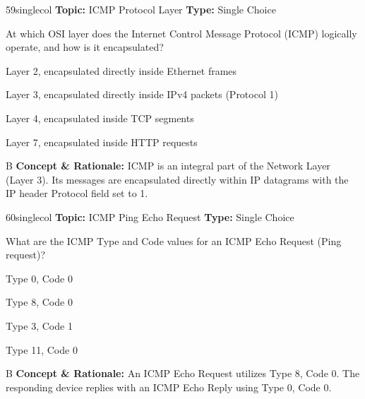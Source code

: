 \begin{qcard}{59}{singlecol}
\textcolor{darkslate!75}{\small\textbf{Topic:} ICMP Protocol Layer \hfill \textbf{Type:} Single Choice}\vspace{0.4em}\par
At which OSI layer does the Internet Control Message Protocol (ICMP) logically operate, and how is it encapsulated?
\begin{qoptions}
\item Layer 2, encapsulated directly inside Ethernet frames
\item Layer 3, encapsulated directly inside IPv4 packets (Protocol 1)
\item Layer 4, encapsulated inside TCP segments
\item Layer 7, encapsulated inside HTTP requests
\end{qoptions}
\end{qcard}
\nopagebreak
\begin{explainbox}{B}
\textbf{Concept \& Rationale:} ICMP is an integral part of the Network Layer (Layer 3). Its messages are encapsulated directly within IP datagrams with the IP header Protocol field set to 1.
\end{explainbox}

\begin{qcard}{60}{singlecol}
\textcolor{darkslate!75}{\small\textbf{Topic:} ICMP Ping Echo Request \hfill \textbf{Type:} Single Choice}\vspace{0.4em}\par
What are the ICMP Type and Code values for an ICMP Echo Request (Ping request)?
\begin{qoptions}
\item Type 0, Code 0
\item Type 8, Code 0
\item Type 3, Code 1
\item Type 11, Code 0
\end{qoptions}
\end{qcard}
\nopagebreak
\begin{explainbox}{B}
\textbf{Concept \& Rationale:} An ICMP Echo Request utilizes Type 8, Code 0. The responding device replies with an ICMP Echo Reply using Type 0, Code 0.
\end{explainbox}

